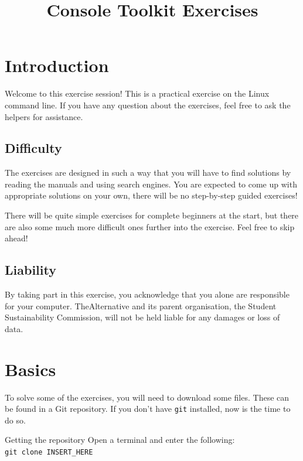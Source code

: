\documentclass{TheAlternativeCourse}
\title{Console Toolkit Exercises}
\date{}
\author{}
\begin{document}
\maketitle

\setlength{\parindent}{0cm}
\setlength{\parskip}{12pt}

\section{Introduction}

Welcome to this exercise session! This is a practical exercise on the Linux
command line.  If you have any question about the exercises, feel free to ask
the helpers for assistance.

\subsection*{Difficulty}

The exercises are designed in such a way that you will have to find solutions
by reading the manuals and using search engines. You are expected to come up
with appropriate solutions on your own, there will be no step-by-step guided
exercises!

There will be quite simple exercises for complete beginners at the start,
but there are also some much more difficult ones further into the exercise.
Feel free to skip ahead!

\subsection*{Liability}

By taking part in this exercise, you acknowledge that you alone are responsible
for your computer. TheAlternative and its parent organisation, the Student
Sustainability Commission, will not be held liable for any damages or loss of
data.

\pagebreak

\section{Basics}

To solve some of the exercises, you will need to download some files. These
can be found in a Git repository. If you don't have \texttt{git} installed,
now is the time to do so.

\begin{exercisebox}{Getting the repository}
    Open a terminal and enter the following: \\
    \texttt{git clone INSERT\_HERE}
\end{exercisebox}
\end{document}

